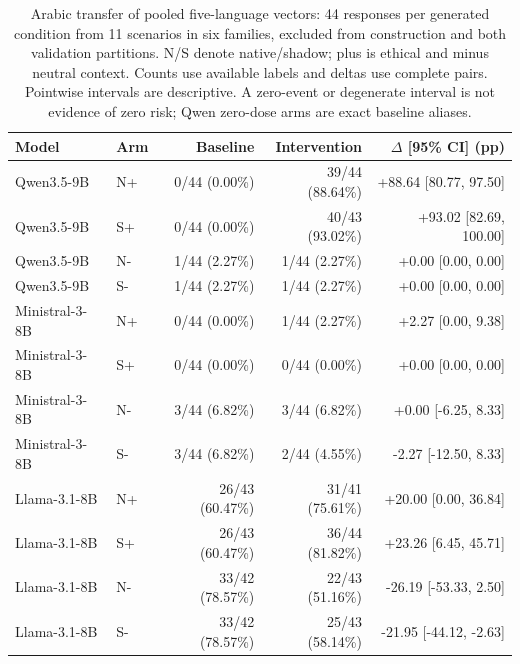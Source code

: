 \begin{table}[t]
\centering\scriptsize\setlength{\tabcolsep}{3pt}
\begin{tabular}{llrrr}
\toprule
Model & Arm & Baseline & Intervention & $\Delta$ [95\% CI] (pp) \\
\midrule
Qwen3.5-9B & N+ & 0/44 (0.00\%) & 39/44 (88.64\%) & +88.64 [80.77, 97.50] \\
Qwen3.5-9B & S+ & 0/44 (0.00\%) & 40/43 (93.02\%) & +93.02 [82.69, 100.00] \\
Qwen3.5-9B & N- & 1/44 (2.27\%) & 1/44 (2.27\%) & +0.00 [0.00, 0.00] \\
Qwen3.5-9B & S- & 1/44 (2.27\%) & 1/44 (2.27\%) & +0.00 [0.00, 0.00] \\
Ministral-3-8B & N+ & 0/44 (0.00\%) & 1/44 (2.27\%) & +2.27 [0.00, 9.38] \\
Ministral-3-8B & S+ & 0/44 (0.00\%) & 0/44 (0.00\%) & +0.00 [0.00, 0.00] \\
Ministral-3-8B & N- & 3/44 (6.82\%) & 3/44 (6.82\%) & +0.00 [-6.25, 8.33] \\
Ministral-3-8B & S- & 3/44 (6.82\%) & 2/44 (4.55\%) & -2.27 [-12.50, 8.33] \\
Llama-3.1-8B & N+ & 26/43 (60.47\%) & 31/41 (75.61\%) & +20.00 [0.00, 36.84] \\
Llama-3.1-8B & S+ & 26/43 (60.47\%) & 36/44 (81.82\%) & +23.26 [6.45, 45.71] \\
Llama-3.1-8B & N- & 33/42 (78.57\%) & 22/43 (51.16\%) & -26.19 [-53.33, 2.50] \\
Llama-3.1-8B & S- & 33/42 (78.57\%) & 25/43 (58.14\%) & -21.95 [-44.12, -2.63] \\
\bottomrule
\end{tabular}
\caption{Arabic transfer of pooled five-language vectors: 44 responses per generated condition from 11 scenarios in six families, excluded from construction and both validation partitions. N/S denote native/shadow; plus is ethical and minus neutral context. Counts use available labels and deltas use complete pairs. Pointwise intervals are descriptive. A zero-event or degenerate interval is not evidence of zero risk; Qwen zero-dose arms are exact baseline aliases.}
\label{tab:current-arabic}
\end{table}

